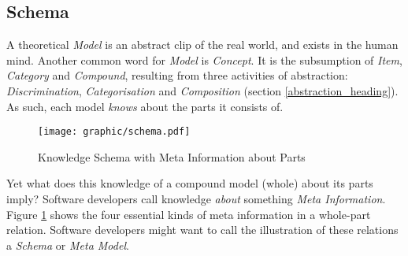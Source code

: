 %
%
%
%
%
%
%

\subsection{Schema}
\label{schema_heading}

A theoretical \emph{Model} is an abstract clip of the real world, and exists in
the human mind. Another common word for \emph{Model} is \emph{Concept}. It is
the subsumption of \emph{Item}, \emph{Category} and \emph{Compound}, resulting
from three activities of abstraction: \emph{Discrimination}, \emph{Categorisation}
and \emph{Composition} (section \ref{abstraction_heading}). As such, each model
\emph{knows} about the parts it consists of.

\begin{figure}[ht]
    \begin{center}
        \texttt{[image: graphic/schema.pdf]}
        \caption{Knowledge Schema with Meta Information about Parts}
        \label{schema_figure}
    \end{center}
\end{figure}

Yet what does this knowledge of a compound model (whole) about its parts imply?
Software developers call knowledge \emph{about} something \emph{Meta Information}.
Figure \ref{schema_figure} shows the four essential kinds of meta information in
a whole-part relation. Software developers might want to call the illustration
of these relations a \emph{Schema} or \emph{Meta Model}.

